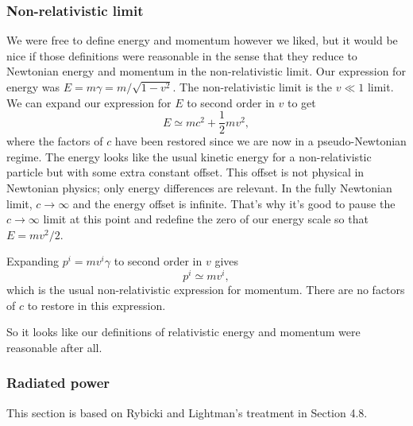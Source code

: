\documentclass{article}
\begin{document}
\subsubsection*{Non-relativistic limit}

We were free to define energy and momentum however we liked, but it would be nice if those definitions were reasonable in the sense that they reduce to Newtonian energy and momentum in the non-relativistic limit. Our expression for energy was $E = m \gamma = m / \sqrt{1 - v^2}$. The non-relativistic limit is the $v \ll 1$ limit. We can expand our expression for $E$ to second order in $v$ to get \begin{equation} E \simeq m c^2 + \frac{1}{2} m v^2 , \end{equation} where the factors of $c$ have been restored since we are now in a pseudo-Newtonian regime. The energy looks like the usual kinetic energy for a non-relativistic particle but with some extra constant offset. This offset is not physical in Newtonian physics; only energy differences are relevant. In the fully Newtonian limit, $c \to \infty$ and the energy offset is infinite. That's why it's good to pause the $c \to \infty$ limit at this point and redefine the zero of our energy scale so that $E = m v^2 / 2$.

Expanding $p^i = m v^i \gamma$ to second order in $v$ gives \begin{equation} p^i \simeq m v^i , \end{equation} which is the usual non-relativistic expression for momentum. There are no factors of $c$ to restore in this expression.

So it looks like our definitions of relativistic energy and momentum were reasonable after all.

\subsubsection*{Radiated power}

This section is based on Rybicki and Lightman's treatment in Section 4.8.
\end{document}
